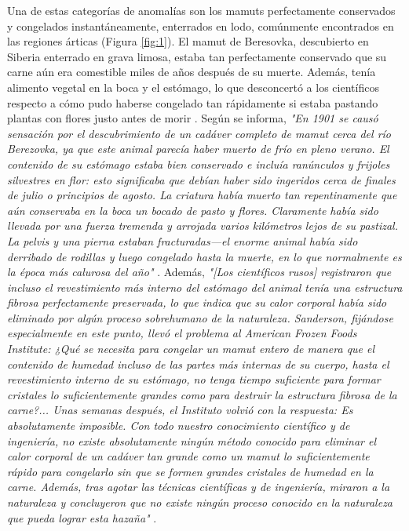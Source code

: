 \documentclass[10pt,twocolumn,letterpaper]{article}
\begin{document}
Una de estas categorías de anomalías son los mamuts perfectamente conservados y congelados instantáneamente, enterrados en lodo, comúnmente encontrados en las regiones árticas (Figura \ref{fig:1}). El mamut de Beresovka, descubierto en Siberia enterrado en grava limosa, estaba tan perfectamente conservado que su carne aún era comestible miles de años después de su muerte. Además, tenía alimento vegetal en la boca y el estómago, lo que desconcertó a los científicos respecto a cómo pudo haberse congelado tan rápidamente si estaba pastando plantas con flores justo antes de morir \cite{17}. Según se informa, \textit{"En 1901 se causó sensación por el descubrimiento de un cadáver completo de mamut cerca del río Berezovka, ya que este animal parecía haber muerto de frío en pleno verano. El contenido de su estómago estaba bien conservado e incluía ranúnculos y frijoles silvestres en flor: esto significaba que debían haber sido ingeridos cerca de finales de julio o principios de agosto. La criatura había muerto tan repentinamente que aún conservaba en la boca un bocado de pasto y flores. Claramente había sido llevada por una fuerza tremenda y arrojada varios kilómetros lejos de su pastizal. La pelvis y una pierna estaban fracturadas—el enorme animal había sido derribado de rodillas y luego congelado hasta la muerte, en lo que normalmente es la época más calurosa del año"} \cite{18}. Además, \textit{"[Los científicos rusos] registraron que incluso el revestimiento más interno del estómago del animal tenía una estructura fibrosa perfectamente preservada, lo que indica que su calor corporal había sido eliminado por algún proceso sobrehumano de la naturaleza. Sanderson, fijándose especialmente en este punto, llevó el problema al American Frozen Foods Institute: ¿Qué se necesita para congelar un mamut entero de manera que el contenido de humedad incluso de las partes más internas de su cuerpo, hasta el revestimiento interno de su estómago, no tenga tiempo suficiente para formar cristales lo suficientemente grandes como para destruir la estructura fibrosa de la carne?... Unas semanas después, el Instituto volvió con la respuesta: Es absolutamente imposible. Con todo nuestro conocimiento científico y de ingeniería, no existe absolutamente ningún método conocido para eliminar el calor corporal de un cadáver tan grande como un mamut lo suficientemente rápido para congelarlo sin que se formen grandes cristales de humedad en la carne. Además, tras agotar las técnicas científicas y de ingeniería, miraron a la naturaleza y concluyeron que no existe ningún proceso conocido en la naturaleza que pueda lograr esta hazaña"} \cite{19}.
\end{document}
